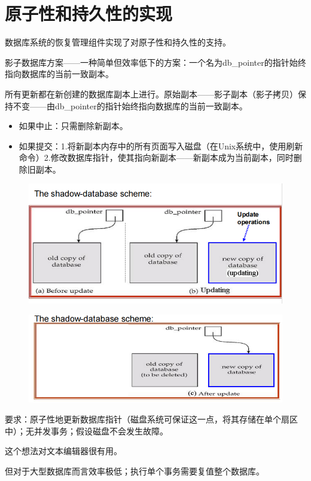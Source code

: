 \section{原子性和持久性的实现}

数据库系统的恢复管理组件实现了对原子性和持久性的支持。

影子数据库方案——一种简单但效率低下的方案：一个名为db\_pointer的指针始终指向数据库的当前一致副本。

所有更新都在新创建的数据库副本上进行。原始副本——影子副本（影子拷贝）保持不变——由db\_pointer的指针始终指向数据库的当前一致副本。
\begin{itemize}
    \item 如果中止：只需删除新副本。
    \item 如果提交：1.将新副本内存中的所有页面写入磁盘（在Unix系统中，使用刷新命令）2.修改数据库指针，使其指向新副本——新副本成为当前副本，同时删除旧副本。
\end{itemize}

\begin{figure}[H]
    \centering
    \includegraphics[width=0.8\linewidth]{image2.png}
    \caption{}
    \label{}
\end{figure}

\begin{figure}[H]
    \centering
    \includegraphics[width=0.8\linewidth]{image3.png}
    \caption{}
    \label{}
\end{figure}

要求：原子性地更新数据库指针（磁盘系统可保证这一点，将其存储在单个扇区中）；无并发事务；假设磁盘不会发生故障。

这个想法对文本编辑器很有用。

但对于大型数据库而言效率极低；执行单个事务需要复值整个数据库。